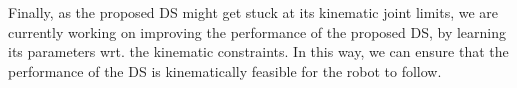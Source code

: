 \documentclass[letterpaper, 10 pt, conference,fleqn]{ieeeconf}
\begin{document}

Finally, as the proposed DS might get stuck at its kinematic joint limits, we are currently working on improving the performance of the proposed DS, by learning its parameters wrt. the kinematic constraints. In this way, we can ensure that the performance of the DS is kinematically feasible for the robot to  follow.

\end{document}

